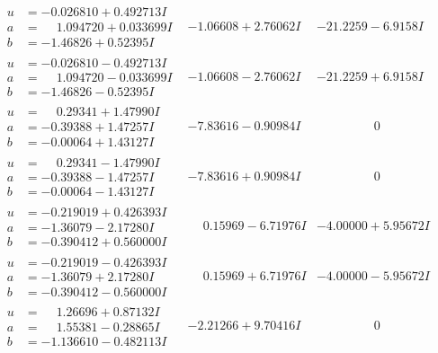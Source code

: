 \documentclass[1p]{elsarticle_modified}
\theoremstyle{definition}
\begin{document}
$$\begin{array}{c|c|c}
\begin{aligned}
u &= -0.026810 + 0.492713 I \\
a &= \phantom{-}1.094720 + 0.033699 I \\
b &= -1.46826 + 0.52395 I\end{aligned}
 & -1.06608 + 2.76062 I & -21.2259 - 6.9158 I \\ \hline\begin{aligned}
u &= -0.026810 - 0.492713 I \\
a &= \phantom{-}1.094720 - 0.033699 I \\
b &= -1.46826 - 0.52395 I\end{aligned}
 & -1.06608 - 2.76062 I & -21.2259 + 6.9158 I \\ \hline\begin{aligned}
u &= \phantom{-}0.29341 + 1.47990 I \\
a &= -0.39388 + 1.47257 I \\
b &= -0.00064 + 1.43127 I\end{aligned}
 & -7.83616 - 0.90984 I & \phantom{-0.000000 } 0 \\ \hline\begin{aligned}
u &= \phantom{-}0.29341 - 1.47990 I \\
a &= -0.39388 - 1.47257 I \\
b &= -0.00064 - 1.43127 I\end{aligned}
 & -7.83616 + 0.90984 I & \phantom{-0.000000 } 0 \\ \hline\begin{aligned}
u &= -0.219019 + 0.426393 I \\
a &= -1.36079 - 2.17280 I \\
b &= -0.390412 + 0.560000 I\end{aligned}
 & \phantom{-}0.15969 - 6.71976 I & -4.00000 + 5.95672 I \\ \hline\begin{aligned}
u &= -0.219019 - 0.426393 I \\
a &= -1.36079 + 2.17280 I \\
b &= -0.390412 - 0.560000 I\end{aligned}
 & \phantom{-}0.15969 + 6.71976 I & -4.00000 - 5.95672 I \\ \hline\begin{aligned}
u &= \phantom{-}1.26696 + 0.87132 I \\
a &= \phantom{-}1.55381 - 0.28865 I \\
b &= -1.136610 - 0.482113 I\end{aligned}
 & -2.21266 + 9.70416 I & \phantom{-0.000000 } 0 \\ \hline\begin{aligned}

\end{aligned}
\end{array}$$
\end{document}
